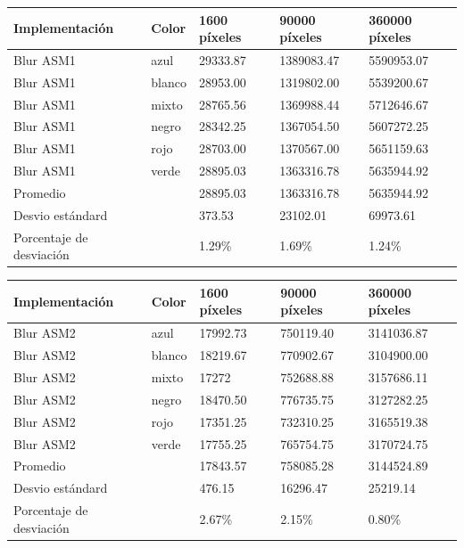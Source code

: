 \begin{tabular}{| l | l | l | l | l |}
\hline
Implementación & Color & 1600 píxeles & 90000 píxeles & 360000 píxeles\\
\hline
Blur ASM1 & azul & 29333.87 & 1389083.47&  5590953.07\\ 
\hline
Blur ASM1 & blanco & 28953.00&  1319802.00 & 5539200.67\\ 
\hline
Blur ASM1 & mixto & 28765.56  &1369988.44  & 5712646.67\\ 
\hline
Blur ASM1 & negro & 28342.25  &1367054.50  & 5607272.25\\
\hline
Blur ASM1 & rojo & 28703.00  &1370567.00  & 5651159.63\\
\hline
Blur ASM1 & verde & 28895.03  &1363316.78  & 5635944.92\\ 
\hline
Promedio & &  28895.03  &1363316.78 & 5635944.92\\
\hline
Desvio estándard  && 373.53  &23102.01 &  69973.61\\
\hline
Porcentaje de desviación  && 1.29\%& 1.69\%& 1.24\%\\
\hline
\end{tabular}

\begin{tabular}{| l | l | l | l | l |}
\hline
Implementación & Color & 1600 píxeles & 90000 píxeles & 360000 píxeles\\
\hline
Blur ASM2 & azul & 17992.73 &  750119.40&  3141036.87\\ 
\hline
Blur ASM2 & blanco & 18219.67  & 770902.67 & 3104900.00\\ 
\hline
Blur ASM2 & mixto &  17272 & 752688.88 & 3157686.11\\ 
\hline
Blur ASM2 & negro & 18470.50  & 776735.75 & 3127282.25\\
\hline
Blur ASM2 & rojo & 17351.25 &  732310.25 & 3165519.38\\
\hline
Blur ASM2 & verde & 17755.25 & 765754.75 & 3170724.75\\ 
\hline
Promedio & &  17843.57  & 758085.28 & 3144524.89\\
\hline
Desvio estándard  && 476.15  & 16296.47  & 25219.14\\
\hline
Porcentaje de desviación  && 2.67\% & 2.15\% & 0.80\%\\
\hline
\end{tabular}

